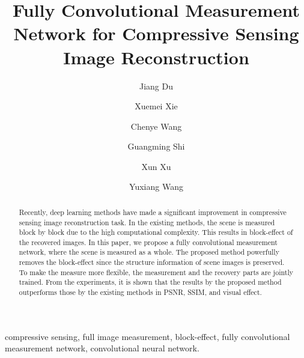 \documentclass[review]{elsarticle}
\begin{document}
\begin{frontmatter}

\title{Fully Convolutional Measurement Network for Compressive Sensing Image Reconstruction}

\author{Jiang Du}

\author{Xuemei Xie}

\author{Chenye Wang}

\author{Guangming Shi}

\author{Xun Xu}

\author{Yuxiang Wang}


\address{School of Artificial
Intelligence, Xidian University, Xi'an, Shaanxi 710071, PR China}

\begin{abstract}
Recently, deep learning methods have made a significant improvement in compressive sensing image reconstruction task. In the existing methods, the scene is measured block by block due to the high computational complexity. This results in block-effect of the recovered images. In this paper, we propose a fully convolutional measurement network, where the scene is measured as a whole. The proposed method powerfully removes the block-effect since the structure information of scene images is preserved. To make the measure more flexible, the measurement and the recovery parts are jointly trained. From the experiments, it is shown that the results by the proposed method outperforms those by the existing methods in PSNR, SSIM, and visual effect.
\end{abstract}

\begin{keyword}
compressive sensing, full image measurement, block-effect, fully convolutional measurement network, convolutional neural network.
\end{keyword}

\end{frontmatter}

\end{document}
